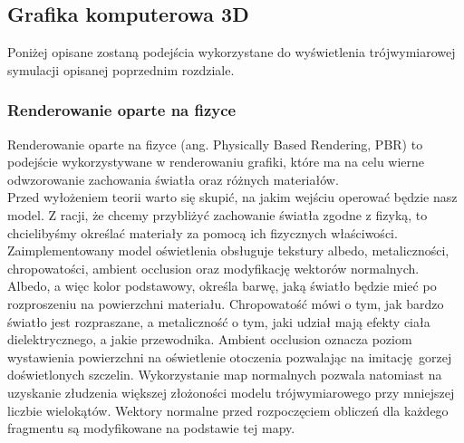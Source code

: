 \subsection{Grafika komputerowa 3D}

Poniżej opisane zostaną podejścia wykorzystane do wyświetlenia trójwymiarowej symulacji opisanej poprzednim rozdziale.

\subsubsection{Renderowanie oparte na fizyce}

Renderowanie oparte na fizyce (ang. Physically Based Rendering, PBR) to podejście wykorzystywane w renderowaniu grafiki, które ma na celu wierne odwzorowanie zachowania światła oraz różnych materiałów.
\\

Przed wyłożeniem teorii warto się skupić, na jakim wejściu operować będzie nasz model. Z racji, że chcemy przybliżyć zachowanie światła zgodne z fizyką, to chcielibyśmy określać materiały za pomocą ich fizycznych właściwości. Zaimplementowany model oświetlenia obsługuje tekstury albedo, metaliczności, chropowatości, ambient occlusion oraz modyfikację wektorów normalnych.
Albedo, a więc kolor podstawowy, określa barwę, jaką światło będzie mieć po rozproszeniu na powierzchni materiału. Chropowatość mówi o tym, jak bardzo światło jest rozpraszane, a  metaliczność o tym, jaki udział mają efekty ciała dielektrycznego, a jakie przewodnika. Ambient occlusion oznacza poziom wystawienia powierzchni na oświetlenie otoczenia pozwalając na imitację gorzej doświetlonych szczelin. Wykorzystanie map normalnych pozwala natomiast na uzyskanie złudzenia większej złożoności modelu trójwymiarowego przy mniejszej liczbie wielokątów. Wektory normalne przed rozpoczęciem obliczeń dla każdego fragmentu są modyfikowane na podstawie tej mapy.
\\

